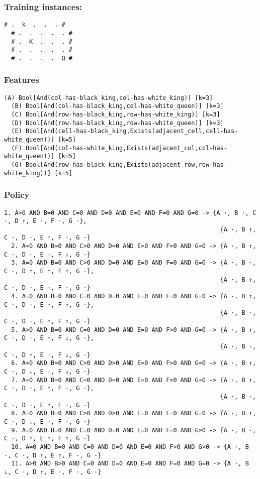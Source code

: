 \documentclass[a4paper]{article}
\begin{document}
\subsubsection{Training instances:}
\begin{Verbatim}[fontsize=\footnotesize]
  # .  k  .  .  . #
  # .  .  .  .  . #
  # .  K  .  .  . #
  # .  .  .  .  . #
  # .  .  .  .  Q #
\end{Verbatim}


\subsubsection{Features}
\begin{Verbatim}[fontsize=\footnotesize]
  (A) Bool[And(col-has-black_king,col-has-white_king)] [k=3]
  (B) Bool[And(col-has-black_king,col-has-white_queen)] [k=3]
  (C) Bool[And(row-has-black_king,row-has-white_king)] [k=3]
  (D) Bool[And(row-has-black_king,row-has-white_queen)] [k=3]
  (E) Bool[And(cell-has-black_king,Exists(adjacent_cell,cell-has-white_queen))] [k=5]
  (F) Bool[And(col-has-white_king,Exists(adjacent_col,col-has-white_queen))] [k=5]
  (G) Bool[And(row-has-black_king,Exists(adjacent_row,row-has-white_king))] [k=5]
\end{Verbatim}

\subsubsection{Policy}
\begin{Verbatim}[fontsize=\footnotesize]
  1. A>0 AND B=0 AND C=0 AND D=0 AND E=0 AND F=0 AND G=0 -> {A ·, B ·, C ·, D ↑, E ·, F ·, G ·},
                                                            {A ·, B ↑, C ·, D ·, E ↑, F ·, G ·}
  2. A=0 AND B=0 AND C>0 AND D=0 AND E=0 AND F>0 AND G=0 -> {A ·, B ↑, C ·, D ·, E ·, F ↓, G ·}
  3. A=0 AND B=0 AND C>0 AND D=0 AND E=0 AND F=0 AND G=0 -> {A ·, B ·, C ·, D ↑, E ↑, F ↑, G ·},
                                                            {A ·, B ↑, C ·, D ·, E ·, F ·, G ·}
  4. A=0 AND B=0 AND C=0 AND D=0 AND E=0 AND F=0 AND G=0 -> {A ·, B ↑, C ·, D ·, E ↑, F ↑, G ·},
                                                            {A ·, B ·, C ·, D ·, E ↑, F ↑, G ·}
  5. A>0 AND B=0 AND C=0 AND D=0 AND E=0 AND F>0 AND G=0 -> {A ·, B ↑, C ·, D ·, E ↑, F ↓, G ·},
                                                            {A ·, B ·, C ·, D ↑, E ·, F ↓, G ·}
  6. A=0 AND B=0 AND C>0 AND D>0 AND E=0 AND F>0 AND G=0 -> {A ·, B ↑, C ·, D ↓, E ·, F ↓, G ·}
  7. A=0 AND B=0 AND C=0 AND D=0 AND E=0 AND F>0 AND G=0 -> {A ·, B ↑, C ·, D ·, E ↑, F ·, G ·},
                                                            {A ·, B ·, C ·, D ·, E ↑, F ·, G ·}
  8. A=0 AND B=0 AND C>0 AND D>0 AND E=0 AND F=0 AND G=0 -> {A ·, B ↑, C ·, D ↓, E ·, F ·, G ·}
  9. A=0 AND B=0 AND C=0 AND D=0 AND E=0 AND F=0 AND G>0 -> {A ·, B ·, C ·, D ↑, E ↑, F ↑, G ·}
  10. A=0 AND B=0 AND C=0 AND D=0 AND E=0 AND F>0 AND G>0 -> {A ·, B ·, C ·, D ↑, E ↑, F ·, G ·}
  11. A>0 AND B>0 AND C=0 AND D=0 AND E=0 AND F=0 AND G=0 -> {A ·, B ↓, C ·, D ↑, E ·, F ·, G ·}
\end{Verbatim}
\end{document}
